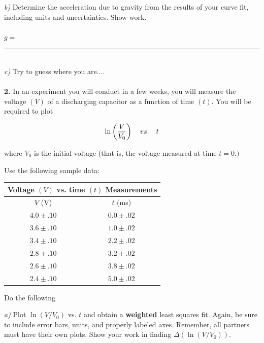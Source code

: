 {\it b)} Determine the acceleration due to gravity from the results of 
your curve fit, including
units and uncertainties. Show work. \\
\vspace*{2cm} \\

\hspace{4cm}$g=$\rule{4.0cm}{.1mm}\\

{\it c)} Try to guess where you are.... \\
\vspace*{0.8cm} \\

\noindent
{\bf 2.} In an experiment you will conduct in a few weeks, you will measure
the voltage $(V)$ of a discharging capacitor as a function of time $(t).$
You will be required
to plot 

$$
\ln \left( {V \over V_0} \right) \quad vs. \quad t
$$

\noindent
where $V_0$ is the initial voltage (that is, the voltage measured at time 
$t=0.)$

\noindent
Use the following sample data:


\vspace*{0.5cm}
\begin{center}
\begin{tabular}{|c|c|}
\hline
\multicolumn{2}{|c|}{Voltage $(V)$ vs. time $(t)$ Measurements} \\
\hline\hline
$V$ (V) & $t$ (ms) \\
\hline
  $4.0 \pm .10$      &   $ 0.0 \pm .02$   \\
\hline    
  $3.6 \pm .10$      &   $ 1.0 \pm .02$   \\
\hline
  $3.4 \pm .10$     &   $ 2.2 \pm .02$   \\
\hline
  $2.8 \pm .10$     &   $ 3.2 \pm .02$    \\
\hline
  $2.6 \pm .10$     &   $3.8 \pm .02$    \\
\hline
  $2.4 \pm .10$      & $5.0 \pm .02$     \\
\hline

\end{tabular}
\end{center}

\vspace*{0.5cm}
\noindent
Do the following

{\it a)} Plot $\ln (V / V_0)$ vs. $t$ and obtain a {\bf weighted} least
squares fit. Again, be sure to include error bars, units, and properly
labeled axes.  Remember, all partners must have their own plots.  
Show your work in finding $\Delta( \ln (V / V_0))$. \\
\vspace*{3cm} \\

